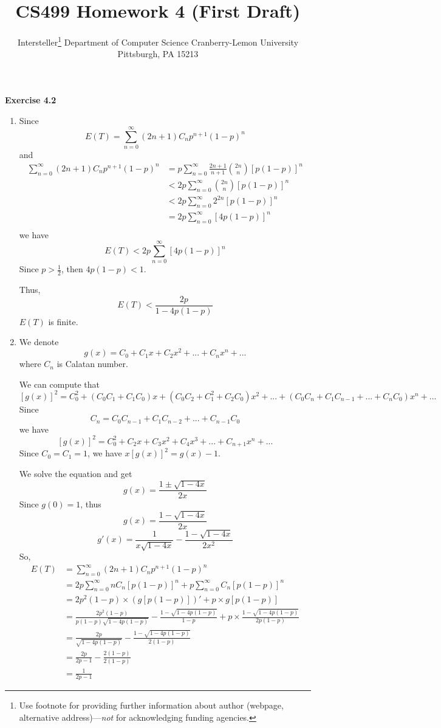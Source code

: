\documentclass{article} %
\title{CS499 Homework 4 (First Draft)}
\author{
	Intersteller\thanks{ Use footnote for providing further information
		about author (webpage, alternative address)---\emph{not} for acknowledging
		funding agencies.}
	Department of Computer Science
	Cranberry-Lemon University
	Pittsburgh, PA 15213
}
\begin{document}
	\maketitle

	\textbf{Exercise 4.2}\par
	\begin{enumerate}
	\item Since $$E(T)=\sum_{n=0}^\infty (2n+1)C_{n}p^{n+1}(1-p)^{n}$$
	and
	\begin{align*}
	\sum_{n=0}^\infty (2n+1)C_{n}p^{n+1}(1-p)^{n}&=p\sum_{n=0}^\infty \frac{2n+1}{n+1} \binom{2n}{n}[p(1-p)]^{n}\\
	&<2p\sum_{n=0}^\infty \binom{2n}{n}[p(1-p)]^{n}\\
	&<2p\sum_{n=0}^\infty 2^{2n}[p(1-p)]^{n}\\
	&=2p\sum_{n=0}^\infty [4p(1-p)]^{n}\\
	\end{align*}
	we have $$E(T)<2p\sum_{n=0}^\infty [4p(1-p)]^{n}$$
	Since $p>\frac{1}{2}$, then $4p(1-p)<1$.\par
	Thus, $$E(T)<\frac{2p}{1-4p(1-p)}$$ $E(T)$ is finite.
	\item We denote $$g(x)=C_0+C_1x+C_2x^2+...+C_{n}x^{n}+...$$ where $C_{n}$ is Calatan number.\par
	We can compute that $$[g(x)]^2=C_0^2+(C_0C_1+C_1C_0)x+(C_0C_2+C_1^2+C_2C_0)x^2+...+(C_0C_{n}+C_1C_{n-1}+...+C_{n}C_0)x^{n}+...$$
	Since $$C_{n}=C_0C_{n-1}+C_1C_{n-2}+...+C_{n-1}C_0$$
	we have $$[g(x)]^2=C_0^2+C_2x+C_3x^2+C_4x^3+...+C_{n+1}x^{n}+...$$
	Since $C_0=C_1=1$, we have $x[g(x)]^2=g(x)-1$.\par
	We solve the equation and get
	$$g(x)=\frac{1\pm\sqrt{1-4x}}{2x}$$
	Since $g(0)=1$, thus 
	$$g(x)=\frac{1-\sqrt{1-4x}}{2x}$$
	$$g'(x)=\frac{1}{x\sqrt{1-4x}}-\frac{1-\sqrt{1-4x}}{2x^2}$$
	So,
	\begin{align*}
	E(T)&=\sum_{n=0}^\infty (2n+1)C_{n}p^{n+1}(1-p)^{n}\\
	&=2p\sum_{n=0}^\infty nC_{n}[p(1-p)]^{n}+p\sum_{n=0}^\infty C_{n}[p(1-p)]^{n}\\
	&=2p^2(1-p)\times (g[p(1-p)])'+p\times g[p(1-p)]\\
	&=\frac{2p^2(1-p)}{p(1-p)\sqrt{1-4p(1-p)}}-\frac{1-\sqrt{1-4p(1-p)}}{1-p}+p\times \frac{1-\sqrt{1-4p(1-p)}}{2p(1-p)}\\
	&=\frac{2p}{\sqrt{1-4p(1-p)}}-\frac{1-\sqrt{1-4p(1-p)}}{2(1-p)}\\
	&=\frac{2p}{2p-1}-\frac{2(1-p)}{2(1-p)}\\
	&=\frac{1}{2p-1}
	\end{align*}
	\end{enumerate}
	
\end{document}
